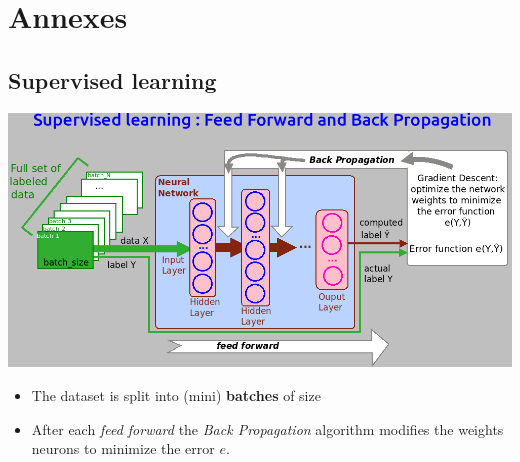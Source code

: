 \documentclass[11pt,serif,mathserif,compress,hyperref={colorlinks}]{beamer}
\begin{document}

\section{Annexes}

\begin{frame}{}

  \vfill
{}
  \vfill

\end{frame}

\subsection{Supervised learning}

\begin{frame}{}

  {\small
    \vspace*{-1mm}\hspace*{-10mm}\includegraphics[width=1.18\textwidth]{./images/NetworkTraining.png}
  \vspace*{-4mm}\begin{itemize}
  \item The dataset is split into (mini) {\bf batches} of size 
  \item After each {\em feed forward} the {\em Back Propagation} algorithm modifies the weights
    neurons to minimize the error $e$.
  \end{itemize}
  }
\end{frame}
\end{document}
